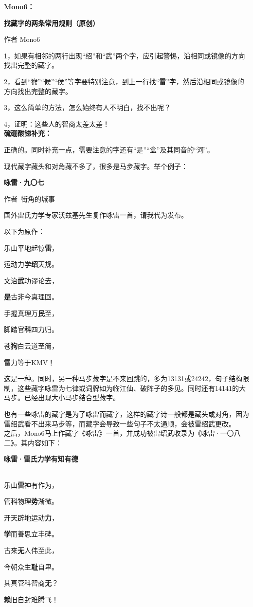 \documentclass[UTF8,12pt,oneside]{ctexbook}
\begin{document}
\noindent \textbf{Mono6：}

\textbf{找藏字的两条常用规则（原创）}

作者 Mono6

1，如果有相邻的两行出现“绍”和“武”两个字，应引起警惕，沿相同或镜像的方向找出完整的藏字。

2，看到“猴”“候”“侯”等字要特别注意，到上一行找“雷”字，然后沿相同或镜像的方向找出完整的藏字。

3，这么简单的方法，怎么始终有人不明白，找不出呢？

4，证明：这些人的智商太差太差！
~\\

\textbf{硫硼酸锑补充：}

正确的。同时补充一点，需要注意的字还有“是”“盒”及其同音的“河”。

现代藏字藏头和对角藏不多了，很多是马步藏字。举个例子：

\begin{center}
\textbf{咏雷·九〇七}

作者\ 街角的城事
\end{center}

国外雷氏力学专家沃兹基先生复作咏雷一首，请我代为发布。

以下为原作：

\begin{center}
    乐山平地起惊\textbf{雷}，

    运动力学\textbf{绍}天规。
    
    文治\textbf{武}功谬论去，
    
    \textbf{是}古非今真理回。
    
    手握真理万\textbf{民}至，
    
    脚踏官\textbf{科}四力归。
    
    苍\textbf{狗}白云道至简，
    
    雷力等于KMV！
\end{center}

这是一种。同时，另一种马步藏字是不来回跳的，多为13131或24242，句子结构限制，这些藏字咏雷为七律或词牌如为临江仙、破阵子的多见。同时还有14141的大马步。已经出现大小马步结合型藏字。

也有一些咏雷的藏字是为了咏雷而藏字，这样的藏字诗一般都是藏头或对角，因为雷绍武看不出来马步等，而藏字会导致一些句子不太通顺，会被雷绍武更改。
~\\

之后，Mono6马上作藏字《咏雷》一首，并成功被雷绍武收录为《咏雷·一〇八二》。其内容如下：

\begin{center}
    \textbf{咏雷·雷氏力学有知有德}
    
    ~\\

    乐山\textbf{雷}神有作为，
    
    管科物理\textbf{势}渐微。
    
    开天辟地运动\textbf{力}，
    
    \textbf{学}而善思立丰碑。
    
    古来\textbf{无}人伟至此，
    
    今朝众生\textbf{耻}自卑。
    
    其真管科智商\textbf{无}？
    
    \textbf{赖}旧自封难腾飞！

\end{center}
\end{document}
